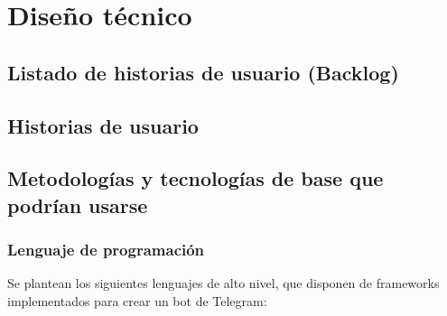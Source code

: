 \chapter{Diseño técnico}

\section{Listado de historias de usuario (Backlog)}

\section{Historias de usuario}

\section{Metodologías y tecnologías de base que podrían usarse}

\subsection{Lenguaje de programación}
Se plantean los siguientes lenguajes de alto nivel, que disponen de frameworks implementados para crear un bot de Telegram:

